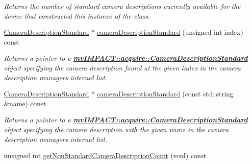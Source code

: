\begin{DoxyCompactItemize}
\begin{DoxyCompactList}\small\item\em Returns the number of standard camera descriptions currently available for the device that constructed this instance of the class. \end{DoxyCompactList}\item 
\hyperlink{classmv_i_m_p_a_c_t_1_1acquire_1_1_camera_description_standard}{Camera\+Description\+Standard} $\ast$ \hyperlink{classmv_i_m_p_a_c_t_1_1acquire_1_1_camera_description_manager_ad804f345731ca3f5a1c53a838a99842c}{camera\+Description\+Standard} (unsigned int index) const 
\begin{DoxyCompactList}\small\item\em Returns a pointer to a {\bfseries \hyperlink{classmv_i_m_p_a_c_t_1_1acquire_1_1_camera_description_standard}{mv\+I\+M\+P\+A\+C\+T\+::acquire\+::\+Camera\+Description\+Standard}} object specifying the camera description found at the given index in the camera description managers internal list. \end{DoxyCompactList}\item 
\hyperlink{classmv_i_m_p_a_c_t_1_1acquire_1_1_camera_description_standard}{Camera\+Description\+Standard} $\ast$ \hyperlink{classmv_i_m_p_a_c_t_1_1acquire_1_1_camera_description_manager_a47790df5d13eef68c9fe5739cb6946ae}{camera\+Description\+Standard} (const std\+::string \&name) const 
\begin{DoxyCompactList}\small\item\em Returns a pointer to a {\bfseries \hyperlink{classmv_i_m_p_a_c_t_1_1acquire_1_1_camera_description_standard}{mv\+I\+M\+P\+A\+C\+T\+::acquire\+::\+Camera\+Description\+Standard}} object specifying the camera description with the given name in the camera description managers internal list. \end{DoxyCompactList}\item 
\hypertarget{classmv_i_m_p_a_c_t_1_1acquire_1_1_camera_description_manager_aaed5fe2628a9f04cd4c860a49bc01ccd}{unsigned int \hyperlink{classmv_i_m_p_a_c_t_1_1acquire_1_1_camera_description_manager_aaed5fe2628a9f04cd4c860a49bc01ccd}{get\+Non\+Standard\+Camera\+Description\+Count} (void) const }\label{classmv_i_m_p_a_c_t_1_1acquire_1_1_camera_description_manager_aaed5fe2628a9f04cd4c860a49bc01ccd}


\end{DoxyCompactItemize}
